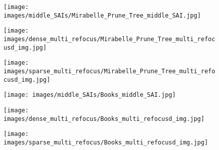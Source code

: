 \begin{figure*}[]
    \begin{subfigure}[t]{0.29\textwidth}
         \centering
         \texttt{[image: images/middle\_SAIs/Mirabelle\_Prune\_Tree\_middle\_SAI.jpg]}
     \end{subfigure}
     \hspace{0.1cm}
    \begin{subfigure}[t]{0.29\textwidth}
         \centering
         \texttt{[image: images/dense\_multi\_refocus/Mirabelle\_Prune\_Tree\_multi\_refocusd\_img.jpg]}
         \caption{}
     \end{subfigure}
     \hspace{0.1cm}
     \begin{subfigure}[t]{0.29\textwidth}
         \centering
         \texttt{[image: images/sparse\_multi\_refocus/Mirabelle\_Prune\_Tree\_multi\_refocusd\_img.jpg]}
     \end{subfigure}

     
    \begin{subfigure}[t]{0.29\textwidth}
         \centering
         \texttt{[image: images/middle\_SAIs/Books\_middle\_SAI.jpg]}
     \end{subfigure}
     \hspace{0.1cm}
    \begin{subfigure}[t]{0.29\textwidth}
         \centering
         \texttt{[image: images/dense\_multi\_refocus/Books\_multi\_refocusd\_img.jpg]}
         \caption{}
     \end{subfigure}
     \hspace{0.1cm}
     \begin{subfigure}[t]{0.29\textwidth}
         \centering
         \texttt{[image: images/sparse\_multi\_refocus/Books\_multi\_refocusd\_img.jpg]}
     \end{subfigure}
     
     

\end{figure*}
